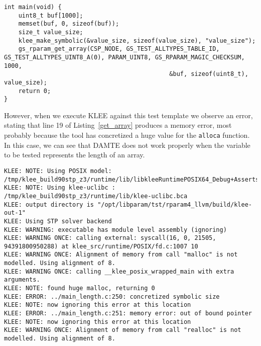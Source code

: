 \begin{lstlisting}[style=CStyle,float=t, caption=Test template for function gs\_rparam\_get\_array., label=get_string]
int main(void) {
    uint8_t buf[1000];
    memset(buf, 0, sizeof(buf));
    size_t value_size;
    klee_make_symbolic(&value_size, sizeof(value_size), "value_size");
    gs_rparam_get_array(CSP_NODE, GS_TEST_ALLTYPES_TABLE_ID, GS_TEST_ALLTYPES_UINT8_A(0), PARAM_UINT8, GS_RPARAM_MAGIC_CHECKSUM, 1000,
                                              &buf, sizeof(uint8_t), value_size);
    return 0;
}
\end{lstlisting}

However, when we execute KLEE against this test template we observe an error, stating that line 19 of Listing~\ref{get_array} produces a memory error, most probably because the tool has concretized a huge value for the \texttt{alloca} function. In this case, we can see that DAMTE does not work properly when the variable to be tested represents the length of an array.

\begin{lstlisting}[style=CStyle,float=t, caption=KLEE error output, label=klee_error]
KLEE: NOTE: Using POSIX model: /tmp/klee_build90stp_z3/runtime/lib/libkleeRuntimePOSIX64_Debug+Asserts.bca
KLEE: NOTE: Using klee-uclibc : /tmp/klee_build90stp_z3/runtime/lib/klee-uclibc.bca
KLEE: output directory is "/opt/libparam/tst/rparam4_llvm/build/klee-out-1"
KLEE: Using STP solver backend
KLEE: WARNING: executable has module level assembly (ignoring)
KLEE: WARNING ONCE: calling external: syscall(16, 0, 21505, 94391800950288) at klee_src/runtime/POSIX/fd.c:1007 10
KLEE: WARNING ONCE: Alignment of memory from call "malloc" is not modelled. Using alignment of 8.
KLEE: WARNING ONCE: calling __klee_posix_wrapped_main with extra arguments.
KLEE: NOTE: found huge malloc, returning 0
KLEE: ERROR: ../main_length.c:250: concretized symbolic size
KLEE: NOTE: now ignoring this error at this location
KLEE: ERROR: ../main_length.c:251: memory error: out of bound pointer
KLEE: NOTE: now ignoring this error at this location
KLEE: WARNING ONCE: Alignment of memory from call "realloc" is not modelled. Using alignment of 8.
\end{lstlisting}

\ENDCHANGEDFINAL